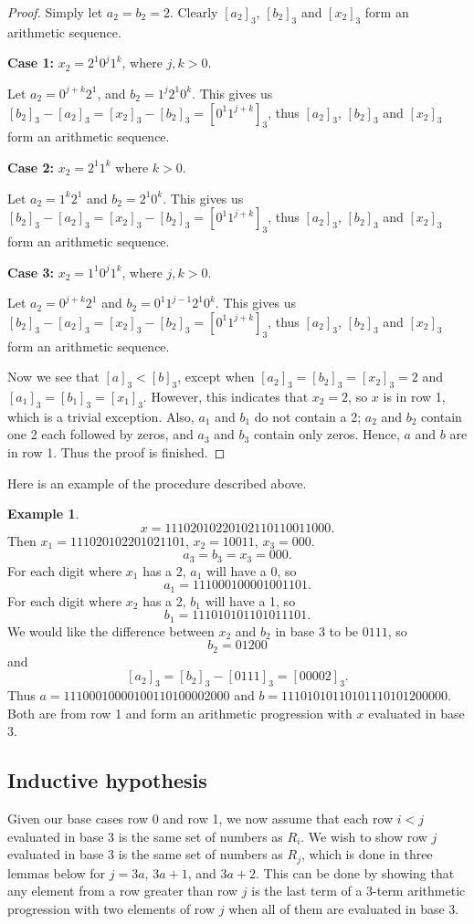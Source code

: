 \documentclass[12pt,reqno]{article}
\theoremstyle{plain}
\theoremstyle{definition}
\newtheorem{example}[theorem]{Example}
\theoremstyle{remark}
\begin{document}
\begin{proof}
Simply let $a_2 = b_2 = 2$. Clearly $[a_2]_3$, $[b_2]_3$ and $[x_2]_3$ form an arithmetic sequence.

\textbf{Case 1:} $x_2 = 2^1 0^j 1^k$, where $j,k>0$.

Let $a_2 = 0^{j+k} 2^1$, and $b_2 = 1^j 2^1 0^k$. This gives us $[b_2]_3 - [a_2]_3 = [x_2]_3 - [b_2]_3 = [0^1 1^{j+k}]_3$, thus $[a_2]_3$, $[b_2]_3$ and $[x_2]_3$ form an arithmetic sequence.

\textbf{Case 2:} $x_2 = 2^1 1^k$ where $k>0$.

Let $a_2 = 1^k 2^1$ and $b_2 = 2^1 0^k$. This gives us $[b_2]_3 - [a_2]_3 = [x_2]_3 - [b_2]_3 = [0^1 1^{j+k}]_3$, thus $[a_2]_3$, $[b_2]_3$ and $[x_2]_3$ form an arithmetic sequence. 

\textbf{Case 3:} $x_2 = 1^1 0^j 1^k$, where $j,k>0$.

Let $a_2 = 0^{j+k} 2^1$ and $b_2 = 0^1 1^{j-1} 2^1 0^k$. This gives us $[b_2]_3 - [a_2]_3 = [x_2]_3 - [b_2]_3 = [0^1 1^{j+k}]_3$, thus $[a_2]_3$, $[b_2]_3$ and $[x_2]_3$ form an arithmetic sequence. 

Now we see that $[a]_3 < [b]_3$, except when $[a_2]_3 = [b_2]_3 = [x_2]_3 = 2$ and $[a_1]_3 = [b_1]_3 = [x_1]_3$. However, this indicates that $x_2 = 2$, so $x$ is in row 1, which is a trivial exception. Also, $a_1$ and $b_1$ do not contain a 2; $a_2$ and $b_2$ contain one 2 each followed by zeros, and $a_3$ and $b_3$ contain only zeros. Hence, $a$ and $b$ are in row 1. Thus the proof is finished.
\end{proof}
Here is an example of the procedure described above.
\begin{example}
\[x = 11102010220102110110011000.\]
Then $x_1 = 111020102201021101$, $x_2 = 10011$, $x_3 = 000$. 
\[a_3 = b_3 = x_3 = 000. \]
For each digit where $x_1$ has a 2, $a_1$ will have a 0, so \[a_1 = 111000100001001101.\]
For each digit where $x_2$ has a 2, $b_1$ will have a 1, so \[b_1 = 111010101101011101.\]
We would like the difference between $x_2$ and $b_2$ in base 3 to be $0111$, so \[b_2 = 01200 \] and \[[a_2]_3 = [b_2]_3 - [0111]_3 = [00002]_3.\]
Thus $a = 11100010000100110100002000$ and $b = 11101010110101110101200000$. Both are from row 1 and form an arithmetic progression with $x$ evaluated in base 3.
\end{example}




\subsection{Inductive hypothesis}
Given our base cases row 0 and row 1, we now assume that each row $i<j$ evaluated in base 3 is the same set of numbers as $R_i$. We wish to show row $j$ evaluated in base 3 is the same set of numbers as $R_j$, which is done in three lemmas below for $j = 3a$, $3a+1$, and $3a+2$. This can be done by showing that any element from a row greater than row $j$ is the last term of a 3-term arithmetic progression with two elements of row $j$ when all of them are evaluated in base 3.
\end{document}
